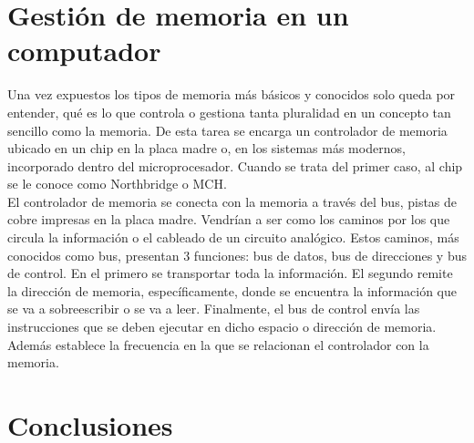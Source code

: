 \documentclass{article}
\begin{document}
\section{Gestión de memoria en un computador}
\noindent
Una vez expuestos los tipos de memoria más básicos y conocidos solo queda por entender, qué es lo que controla o gestiona tanta pluralidad en un concepto tan sencillo como la memoria.
De esta tarea se encarga un controlador de memoria ubicado en un chip en la placa madre o, en los sistemas más modernos, incorporado dentro del microprocesador. Cuando se trata del primer caso, al chip se le conoce como Northbridge o MCH.\\

\noindent
El controlador de memoria se conecta con la memoria a través del bus, pistas de cobre impresas en la placa madre. Vendrían a ser como los caminos por los que circula la información o el cableado de un circuito analógico.
Estos caminos, más conocidos como bus, presentan 3 funciones: bus de datos, bus de direcciones y bus de control.
En el primero se transportar toda la información.
El segundo remite la dirección de memoria, específicamente, donde se encuentra la información que se va a sobreescribir o se va a leer.
Finalmente, el bus de control envía las instrucciones que se deben ejecutar en dicho espacio o dirección de memoria. Además establece la frecuencia en la que se relacionan el controlador con la memoria. 




\section{Conclusiones}



\end{document}
